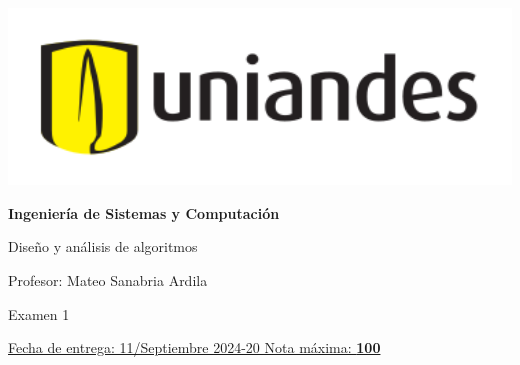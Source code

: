 \documentclass[12pt, a4paper]{exam}
\begin{document}
\noindent
\begin{minipage}[l]{0.1\textwidth}
    \noindent
    \includegraphics[width=1.8\textwidth]{Logosimbolo-uniandes_horizontal.png}
\end{minipage}
\hfill
\begin{minipage}[c]{0.8\textwidth}
    \begin{center}
        {\large \textbf{Ingeniería de Sistemas y Computación} \par
            \large	Diseño y análisis de algoritmos	\par
            \small  Profesor: Mateo Sanabria Ardila	\par
            \small  Examen 1	\par
        }
    \end{center}
\end{minipage}
\par
\vspace{0.2in}
\noindent
\uline{Fecha de entrega: 11/Septiembre 	\hfill  2024-20		\hfill Nota máxima: \textbf{100} }
\par
\vspace{0.15in}
\end{document}
